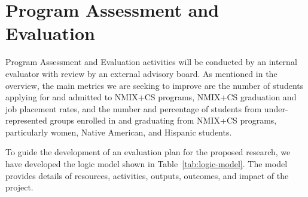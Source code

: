 \section{Program Assessment and Evaluation}
\label{sec:assessment}
Program Assessment and Evaluation activities will be conducted by an internal evaluator with review by an external advisory board. As mentioned in the overview, the main metrics we are seeking to improve are the number of students applying for and admitted to NMIX+CS programs, NMIX+CS graduation and job placement rates, and the number and percentage of students from under-represented groups enrolled in and graduating from NMIX+CS programs, particularly women, Native American, and Hispanic students. 


To guide the development of an evaluation plan for the proposed research, we have developed the logic model shown in Table~\ref{tab:logic-model}. The model provides details of resources, activities, outputs, outcomes, and impact of the project.

